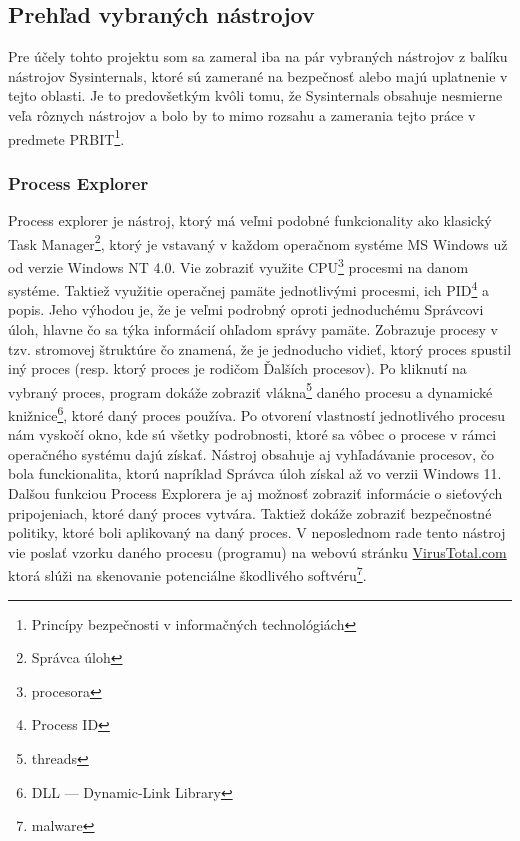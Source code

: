 \documentclass[conference]{IEEEtran}
\begin{document}
\subsection{Prehľad vybraných nástrojov}
Pre účely tohto projektu som sa zameral iba na pár vybraných nástrojov z balíku nástrojov Sysinternals, ktoré sú zamerané na bezpečnosť alebo majú uplatnenie v tejto oblasti. Je to predovšetkým kvôli tomu, že Sysinternals obsahuje nesmierne veľa rôznych nástrojov a bolo by to mimo rozsahu a zamerania tejto práce v predmete PRBIT\footnote{Princípy bezpečnosti v informačných technológiách}.
\subsubsection{Process Explorer}
Process explorer je nástroj, ktorý má veľmi podobné funkcionality ako klasický Task Manager\footnote{Správca úloh}, ktorý je vstavaný v každom operačnom systéme MS Windows už od verzie Windows NT 4.0. Vie zobraziť využite CPU\footnote{procesora} procesmi na danom systéme. Taktiež využitie operačnej pamäte jednotlivými procesmi, ich PID\footnote{Process ID} a popis. Jeho výhodou je, že je veľmi podrobný oproti jednoduchému Správcovi úloh, hlavne čo sa týka informácií ohľadom správy pamäte. Zobrazuje procesy v tzv. stromovej štruktúre čo znamená, že je jednoducho vidieť, ktorý proces spustil iný proces (resp. ktorý proces je rodičom Ďalších procesov). Po kliknutí na vybraný proces, program dokáže zobraziť vlákna\footnote{threads} daného procesu a dynamické knižnice\footnote{DLL --- Dynamic-Link Library}, ktoré daný proces používa. Po otvorení vlastností jednotlivého procesu nám vyskočí okno, kde sú všetky podrobnosti, ktoré sa vôbec o procese v rámci operačného systému dajú získať. Nástroj obsahuje aj vyhľadávanie procesov, čo bola funckionalita, ktorú napríklad Správca úloh získal až vo verzii Windows 11. Dalšou funkciou Process Explorera je aj možnosť zobraziť informácie o sieťových pripojeniach, ktoré daný proces vytvára. Taktiež dokáže zobraziť bezpečnostné politiky, ktoré boli aplikovaný na daný proces. V neposlednom rade tento nástroj vie poslať vzorku daného procesu (programu) na webovú stránku \href{https://www.virustotal.com/gui/home/upload}{VirusTotal.com} ktorá slúži na skenovanie potenciálne škodlivého softvéru\footnote{malware}. 
\end{document}
